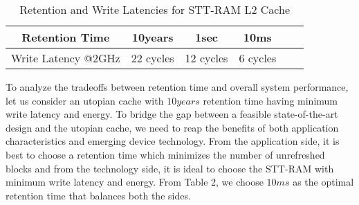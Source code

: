 

\begin{table}[t]
  \centering
   \singlespacing
  \caption{Retention and Write Latencies for STT-RAM L2 Cache}
  \label{table:rt-wt}
  
  \begin{tabular}{| c | c | c | c | c | c |}
    \hline
     Retention Time & 10years & 1sec &10ms \\
    \hline
    Write Latency @2GHz & 22 cycles & 12 cycles & 6 cycles \\
    \hline
  \end{tabular}
\end{table}

To analyze the tradeoffs between retention time and overall system performance, let us consider an utopian cache
with $10years$ retention time having minimum write latency and energy.  To bridge the gap between a
feasible state-of-the-art design and the utopian cache, we need to reap the benefits of both application
characteristics and emerging device technology. From the application side, it is best to choose a retention time
which minimizes the number of unrefreshed blocks and from the technology side, it is ideal to choose the
STT-RAM with minimum write latency and energy. From Table 2, we choose $10ms$ as the optimal retention time that
balances both the sides.
